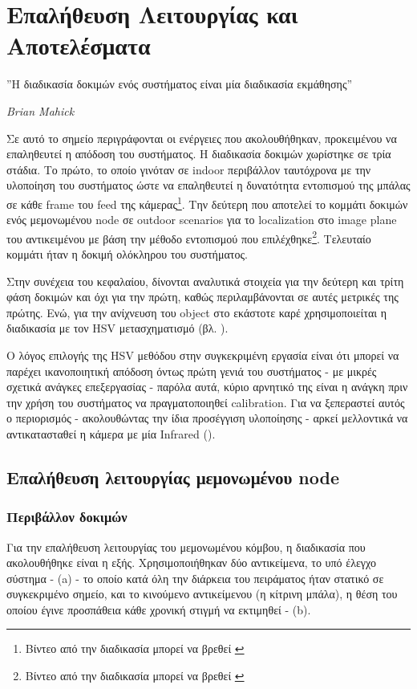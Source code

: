 \chapter{Επαλήθευση Λειτουργίας και Αποτελέσματα} %
\label{chap:Chapter6}

\epigraph{”Η διαδικασία δοκιμών ενός συστήματος είναι μία διαδικασία εκμάθησης''}{\textit{Brian Mahick}}

Σε αυτό το σημείο περιγράφονται οι ενέργειες που ακολουθήθηκαν, προκειμένου να επαληθευτεί η απόδοση του συστήματος.
Η διαδικασία δοκιμών χωρίστηκε σε τρία στάδια. Το πρώτο, το οποίο γινόταν σε indoor περιβάλλον ταυτόχρονα με την υλοποίηση του συστήματος
ώστε να επαληθευτεί η δυνατότητα εντοπισμού της μπάλας σε κάθε frame του feed της κάμερας\footnote{Βίντεο από την διαδικασία μπορεί να βρεθεί \cite{experiment-1-video}}. Την δεύτερη
που αποτελεί το κομμάτι δοκιμών ενός μεμονωμένου node σε outdoor scenarios για το localization στο image plane του αντικειμένου με βάση την μέθοδο εντοπισμού που επιλέχθηκε\footnote{
Βίντεο από την διαδικασία μπορεί να βρεθεί \cite{experiment-2-video}}. Τελευταίο κομμάτι ήταν η δοκιμή ολόκληρου του συστήματος.

Στην συνέχεια του κεφαλαίου, δίνονται αναλυτικά στοιχεία για την δεύτερη και τρίτη φάση δοκιμών και όχι για την πρώτη, καθώς περιλαμβάνονται σε αυτές μετρικές της πρώτης. Ενώ, για την ανίχνευση του object στο εκάστοτε καρέ χρησιμοποιείται η διαδικασία με τον HSV μετασχηματισμό (βλ. ).

Ο λόγος επιλογής της HSV μεθόδου στην συγκεκριμένη εργασία είναι ότι μπορεί να παρέχει ικανοποιητική απόδοση όντως πρώτη γενιά του συστήματος - με μικρές σχετικά ανάγκες επεξεργασίας - παρόλα αυτά, κύριο αρνητικό της είναι η ανάγκη πριν την χρήση του συστήματος να πραγματοποιηθεί calibration. Για
να ξεπεραστεί αυτός ο περιορισμός - ακολουθώντας την ίδια προσέγγιση υλοποίησης - αρκεί μελλοντικά να αντικατασταθεί η κάμερα με μία Infrared ().

\section{Επαλήθευση λειτουργίας μεμονωμένου node}

\subsection{Περιβάλλον δοκιμών}
Για την επαλήθευση λειτουργίας του μεμονωμένου κόμβου, η διαδικασία που ακολουθήθηκε είναι η εξής. 
Χρησιμοποιήθηκαν δύο αντικείμενα, το υπό έλεγχο σύστημα -  (a) - το οποίο κατά όλη την διάρκεια του πειράματος ήταν στατικό σε συγκεκριμένο σημείο, και το κινούμενο αντικείμενου (η κίτρινη μπάλα), η θέση του οποίου έγινε προσπάθεια κάθε χρονική στιγμή να εκτιμηθεί -  (b).   

